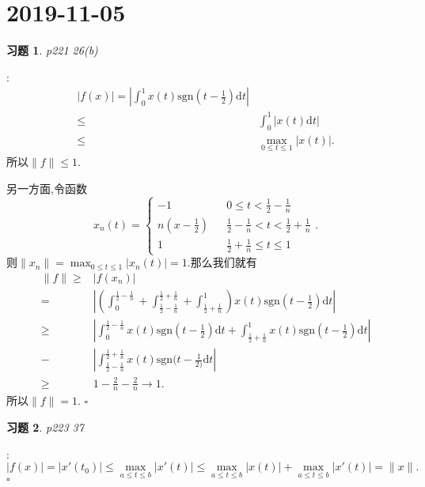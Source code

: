 \documentclass[a4paper]{article}
\newtheorem*{exe}{习题}
\newenvironment{sol}{{\noindent\bfseries 解}:}{\hfill $\square$\par}
\begin{document}
\section{2019-11-05}
\begin{exe}
  p221 26(b)
\end{exe} 
\begin{sol}
  \begin{align*}
    \left| f(x) \right| =\left| \int_0^{1}x(t)\text{sgn}(t-\frac{1}{2})\mathrm{d}t \right|\\
    \le & \int_0^{1}\left| x(t)\mathrm{d}t \right| \\
    \le & \max_{0\le t\le 1}\left| x(t) \right| 
  .\end{align*}
  所以$\|f\|\le 1$.

  另一方面,令函数
  \[
    x_n(t)=\left\{\begin{array}{lcr}
	-1 & & {0\le t<\frac{1}{2}-\frac{1}{n}}\\
	n(x-\frac{1}{2}) & &  \frac{1}{2}-\frac{1}{n}<t<\frac{1}{2}+\frac{1}{n}\\
	1 & &  \frac{1}{2}+\frac{1}{n}\le t\le 1
      \end{array}\right.
  .\]
  则$\|x_n\|=\max_{0\le t\le 1}\left| x_n(t) \right| =1$.那么我们就有
  \begin{align*}
    \|f\|\ge & \left| f(x_n) \right|\\
    = & \left| \left( \int_{0}^{\frac{1}{2}-\frac{1}{n}}+\int_{\frac{1}{2}-\frac{1}{n}}^{\frac{1}{2}+\frac{1}{n}}+\int_{\frac{1}{2}+\frac{1}{n}}^{1} \right)x(t)\text{sgn}(t-\frac{1}{2})\mathrm{d}t\right|\\
    \ge & \left| \int_{0}^{\frac{1}{2}-\frac{1}{n}}x(t)\text{sgn}(t-\frac{1}{2})\mathrm{d}t+\int_{\frac{1}{2}+\frac{1}{n}}^{1}x(t)\text{sgn}(t-\frac{1}{2})\mathrm{d}t \right|\\
    - & \left| \int_{\frac{1}{2}-\frac{1}{n}}^{\frac{1}{2}+\frac{1}{n}}x(t)\text{sgn}(t-\frac{1}{2)}\mathrm{d}t \right|\\ 
    \ge & 1-\frac{2}{n}-\frac{2}{n}\to 1 
  .\end{align*}
  所以$\|f\|=1$.
\end{sol}
\begin{exe}
  p223 37	
\end{exe}
\begin{sol}
  \[
    \left| f(x) \right| =\left| x'(t_0) \right| \le \max_{a\le t\le b}\left| x'(t) \right| \le \max_{a\le t\le b}\left| x(t) \right|+\max_{a\le t\le b}\left| x'(t) \right| =\|x\| 
  .\] 
\end{sol}
\end{document}
